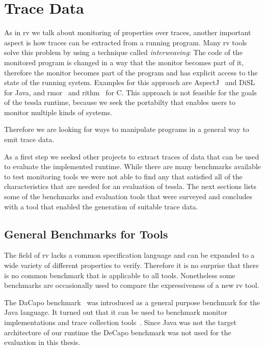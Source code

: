 \section{Trace Data}
\label{sec:related:traces}

As in \gls{rv} we talk about monitoring of properties over traces, another important aspect is how traces can be extracted from a running program.
Many \gls{rv} tools solve this problem by using a technique called \emph{interweaving}: The code of the monitored program is changed in a way that the monitor becomes part of it, therefore the monitor becomes part of the program and has explicit access to the state of the running system.
Examples for this approach are AspectJ~\cite{Kiczales2001} and DiSL~\cite{Marek2012} for Java, and \gls{rmor}~\cite{Havelund2008} and \gls{rithm}~\cite{Navabpour2013} for C.
This approach is not feasible for the goals of the \gls{tessla} runtime, because we seek the portabilty that enables users to monitor multiple kinds of systems.

Therefore we are looking for ways to manipulate programs in a general way to emit trace data.

As a first step we seeked other projects to extract traces of data that can be used to evaluate the implemented runtime.
While there are many benchmarks available to test monitoring tools we were not able to find any that satisfied all of the characteristics that are needed for an evaluation of \gls{tessla}.
The next sections lists some of the benchmarks and evaluation tools that were surveyed and concludes with a tool that enabled the generation of suitable trace data.

\subsection{General Benchmarks for  Tools}

The field of \gls{rv} lacks a common specification language and can be expanded to a wide variety of different properties to verify.
Therefore it is no surprise that there is no common benchmark that is applicable to all tools.
Nonetheless some benchmarks are occasionally used to compare the expressiveness of a new \gls{rv} tool.

The DaCapo benchmark~\citep{Blackburn2006} was introduced as a general purpose benchmark for the Java language.
It turned out that it can be used to benchmark monitor implementations and trace collection tools~\citep{Wu2016,Chen2007,Marek2012}.
Since Java was not the target architecture of our runtime the DeCapo benchmark was not used for the evaluation in this thesis.

